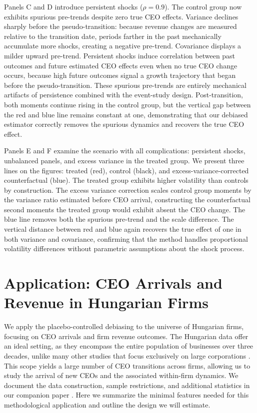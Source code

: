 \documentclass[11pt,a4paper]{article}
\begin{document}
Panels C and D introduce persistent shocks ($\rho=0.9$). The control group now exhibits spurious pre-trends despite zero true CEO effects. Variance declines sharply before the pseudo-transition: because revenue changes are measured relative to the transition date, periods farther in the past mechanically accumulate more shocks, creating a negative pre-trend. Covariance displays a milder upward pre-trend. Persistent shocks induce correlation between past outcomes and future estimated CEO effects even when no true CEO change occurs, because high future outcomes signal a growth trajectory that began before the pseudo-transition. These spurious pre-trends are entirely mechanical artifacts of persistence combined with the event-study design. Post-transition, both moments continue rising in the control group, but the vertical gap between the red and blue line remains constant at one, demonstrating that our debiased estimator correctly removes the spurious dynamics and recovers the true CEO effect.

Panels E and F examine the scenario with all complications: persistent shocks, unbalanced panels, and excess variance in the treated group. We present three lines on the figures: treated (red), control (black), and excess-variance-corrected counterfactual (blue). The treated group exhibits higher volatility than controls by construction. The excess variance correction scales control group moments by the variance ratio estimated before CEO arrival, constructing the counterfactual second moments the treated group would exhibit absent the CEO change. The blue line removes both the spurious pre-trend and the scale difference. The vertical distance between red and blue again recovers the true effect of one in both variance and covariance, confirming that the method handles proportional volatility differences without parametric assumptions about the shock process.

\section{Application: CEO Arrivals and Revenue in Hungarian Firms}

We apply the placebo-controlled debiasing to the universe of Hungarian firms, focusing on CEO arrivals and firm revenue outcomes. The Hungarian data offer an ideal setting, as they encompass the entire population of businesses over three decades, unlike many other studies that focus exclusively on large corporations \citep{Bertrand2003-io, crossland2011differences, quigley2015has}. This scope yields a large number of CEO  transitions across firms, allowing us to study the arrival of new CEOs and the associated within-firm dynamics. We document the data construction, sample restrictions, and additional statistics in our companion paper \citep{ceo_value}. Here we summarize the minimal features needed for this methodological application and outline the design we will estimate.
\end{document}
